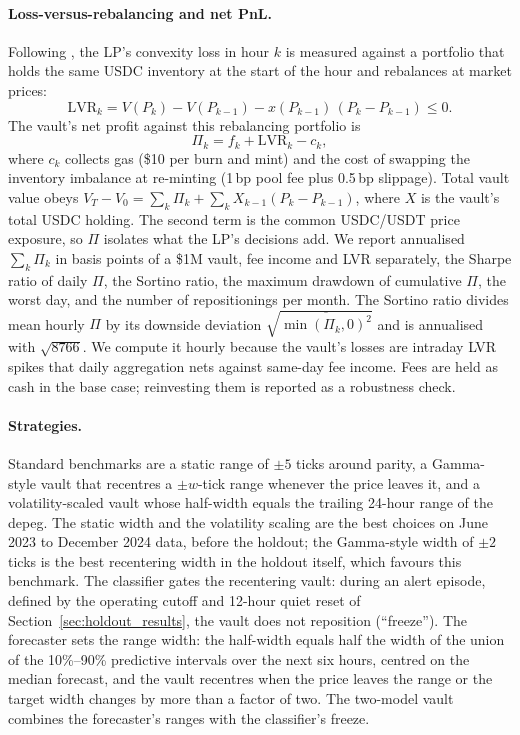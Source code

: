 \paragraph{Loss-versus-rebalancing and net PnL.} Following \citet{Milionis2022}, the LP's
convexity loss in hour $k$ is measured against a portfolio that holds the same USDC inventory at
the start of the hour and rebalances at market prices:
\begin{equation}
\mathrm{LVR}_k=V(P_k)-V(P_{k-1})-x(P_{k-1})\,(P_k-P_{k-1})\le 0 .
\end{equation}
The vault's net profit against this rebalancing portfolio is
\begin{equation}
\Pi_k=f_k+\mathrm{LVR}_k-c_k ,
\end{equation}
where $c_k$ collects gas (\$10 per burn and mint) and the cost of swapping the inventory
imbalance at re-minting (1\,bp pool fee plus 0.5\,bp slippage). Total vault value obeys
$V_T-V_0=\sum_k \Pi_k+\sum_k X_{k-1}(P_k-P_{k-1})$, where $X$ is the vault's total USDC
holding. The second term is the common USDC/USDT price exposure, so $\Pi$ isolates what the
LP's decisions add. We report annualised $\sum_k\Pi_k$ in basis points of a \$1M vault,
fee income and LVR separately, the Sharpe ratio of daily $\Pi$, the Sortino ratio, the
maximum drawdown of cumulative $\Pi$, the worst day, and the number of repositionings per
month. The Sortino ratio divides mean hourly $\Pi$ by its downside deviation
$\sqrt{\overline{\min(\Pi_k,0)^2}}$ and is annualised with $\sqrt{8766}$. We compute it hourly
because the vault's losses are intraday LVR spikes that daily aggregation nets against same-day
fee income. Fees are held as
cash in the base case; reinvesting them is reported as a robustness check.

\paragraph{Strategies.} Standard benchmarks are a static range of $\pm5$ ticks around parity, a
Gamma-style vault that recentres a $\pm w$-tick range whenever the price leaves it, and a
volatility-scaled vault whose half-width equals the trailing 24-hour range of the depeg. The
static width and the volatility scaling are the best choices on June 2023 to December 2024
data, before the holdout; the Gamma-style width of $\pm2$ ticks is the best recentering width
in the holdout itself, which favours this benchmark. The classifier gates the recentering vault: during an alert episode,
defined by the operating cutoff and 12-hour quiet reset of Section~\ref{sec:holdout_results},
the vault does not reposition (``freeze''). The forecaster sets the range width: the
half-width equals half the width of the union of the 10\%--90\% predictive intervals over the
next six hours, centred on the median forecast, and the vault recentres when the price leaves
the range or the target width changes by more than a factor of two. The two-model vault
combines the forecaster's ranges with the classifier's freeze.

